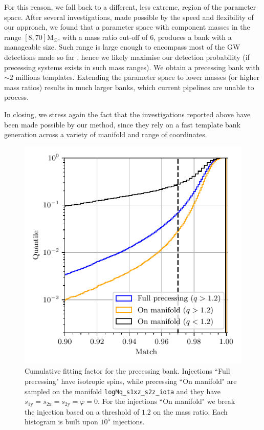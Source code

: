 \documentclass[twocolumn,showpacs,preprintnumbers,nofootinbib,prd,
superscriptaddress,10pt]{revtex4-2}
\begin{document}
For this reason, we fall back to a different, less extreme, region of the parameter space. After several investigations, made possible by the speed and flexibility of our approach, we found that a parameter space with component masses in the range $[8, 70] \mathrm{M_\odot}$, with a mass ratio cut-off of $6$, produces a bank with a manageable size.
Such range is large enough to encompass most of the GW detections made so far \cite{LIGOScientific:2020kqk, KAGRA:2021duu}, hence we likely maximise our detection probability (if precessing systems exists in such mass ranges).
We obtain a precessing bank with $\sim 2 \text{ millions}$ templates. Extending the parameter space to lower masses (or higher mass ratios) results in much larger banks, which current pipelines are unable to process.

In closing, we stress again the fact that the investigations reported above have been made possible by our method, since they rely on a fast template bank generation across a variety of manifold and range of coordinates.

\begin{figure}[t]
	\centering
	\includegraphics[scale = 1.]{precessing_hist}
	\caption{Cumulative fitting factor for the precessing bank. Injections ``Full precessing" have isotropic spins, while precessing ``On manifold" are sampled on the manifold \texttt{logMq\_s1xz\_s2z\_iota} and they have $s_\text{1y} = s_\text{2x} = s_\text{2y} = \varphi = 0$. For the injections ``On manifold" we break the injection based on a threshold of $1.2$ on the mass ratio. Each histogram is built upon $10^5$ injections.}
	\label{fig:precessing_hist}
\end{figure}
\end{document}
